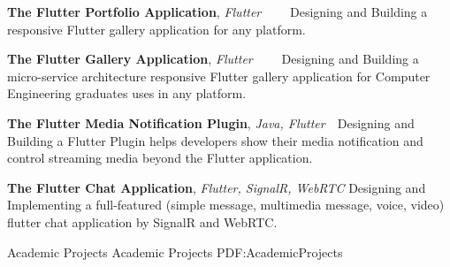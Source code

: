 \documentclass[letterpaper,MMMyyyy,nonstopmode]{resume}
\newcommand{\CVWebpage}{https://aliyazdi.tech}
\begin{document}
\begin{Body}
\BigGap
\BulletItem
\textbf{The Flutter Portfolio Application},
\textit{\small{Flutter}}
\hfill
{\normalsize{
\href{https://snapcraft.io/aliyazdi75}
{\faLinux}
\,\SubBulletSymbol\,
\href{https://github.com/aliyazdi75/aliyazdi75.github.io/releases}
{\faAndroid}
\,\SubBulletSymbol\,
\href{\CVWebpage}
{\faGlobe}
\,\SubBulletSymbol\,
\href{https://github.com/aliyazdi75/aliyazdi75.github.io}
{\faGithub}
}}
\Item
Designing and Building a responsive Flutter gallery application for any platform.

\BigGap
\BulletItem
\textbf{The Flutter Gallery Application},
\textit{\small{Flutter}}
\hfill
{\normalsize{
\href{https://medium.com/flutter-community/the-software-engineering-approach-in-cross-platform-programming-with-flutter-part-1-efcdc8a8fc26?source=friends_link&sk=ceb60f56685ce66c7f9574595748f25b}
{\faMedium}
\,\SubBulletSymbol\,
\href{https://github.com/aliyazdi75/gallery/releases}
{\faAndroid}
\,\SubBulletSymbol\,
\href{https://aliyazdi75.github.io/gallery}
{\faGlobe}
\,\SubBulletSymbol\,
\href{https://github.com/aliyazdi75/gallery}
{\faGithub}
}}
\Item
Designing and Building a micro-service architecture responsive Flutter gallery application for Computer Engineering graduates uses in any platform.

\BigGap
\BulletItem
\textbf{The Flutter Media Notification Plugin},
\textit{\small{Java, Flutter}}
\hfill
{\normalsize{
\href{https://pub.dev/packages/flutter_media_notification}
{\faGlobe}
\,\SubBulletSymbol\,
\href{https://github.com/aliyazdi75/flutter_media_notification}
{\faGithub}
}}
\Item
Designing and Building a Flutter Plugin helps developers show their media notification and control streaming media beyond the Flutter application.

\BigGap
\BulletItem
\textbf{The Flutter Chat Application},
\textit{\small{Flutter, SignalR, WebRTC}}
\hfill
{\normalsize{
\href{https://github.com/aliyazdi75/flutter_chat}
{\faGithub}
}}
\Item
Designing and Implementing a full-featured (simple message, multimedia message, voice, video) flutter chat application by SignalR and WebRTC.


\newpage


\Section
{Academic Projects}
{Academic Projects}
{PDF:AcademicProjects}



\end{Body}
\end{document}
